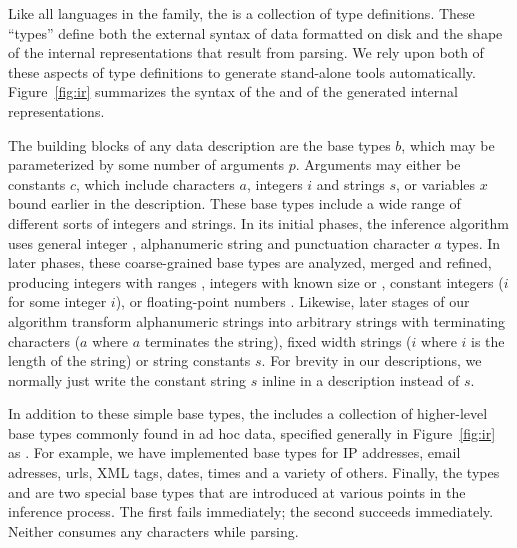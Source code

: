 Like all languages in the \pads{} family, the \ir{} is a collection of
type definitions.  These ``types'' define both the external syntax of
data formatted on disk and the shape of the internal representations
that result from parsing.  We rely upon both of these aspects of type
definitions to generate stand-alone tools automatically.
Figure~\ref{fig:ir} summarizes the syntax of the \ir{} and of the
generated internal representations. 

The building blocks of any \ir{} data description are the base types $b$,
which may be parameterized by some number of arguments $p$.  Arguments
may either be constants $c$, which include characters $a$, integers
$i$ and strings $s$, or variables $x$ bound earlier in the description.
These base types include a wide range of different sorts of
integers and strings.  In its initial phases, the inference algorithm
uses general integer , alphanumeric string 
and punctuation character $a$\cd{)} types.  In later phases,
these coarse-grained base types are analyzed, merged and refined, producing
integers with ranges ,
integers with known size  or , constant integers
($i$\cd{)} for some integer $i$), or floating-point
numbers .  Likewise, later stages of our algorithm transform
alphanumeric strings into arbitrary strings with terminating characters
($a$\cd{)} where $a$ terminates the string), fixed width
strings ($i$\cd{)} where $i$ is the length of the string) 
or string constants $s$\cd{)}.  For brevity in
our descriptions, we normally just write the constant string $s$
inline in a description instead of $s$\cd{)}.

In addition to these simple base types, the \ir{} includes a
collection of higher-level base types commonly found in ad hoc data,
specified generally in Figure~\ref{fig:ir} as .  For
example, we have implemented base types for IP addresses, email
adresses, urls, XML tags, dates, times and a variety of
others. Finally, the types  and  are two special
base types that are introduced at various points in the inference
process.  The first fails immediately; the second succeeds
immediately.  Neither consumes any characters while parsing.

